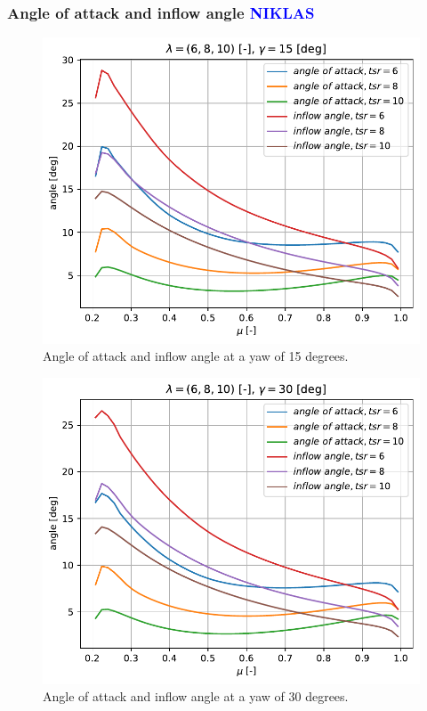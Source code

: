 \subsubsection{\textbf{Angle of attack and inflow angle} \textcolor{blue}{NIKLAS}}
\begin{figure}[htbp]
	\centering
	\includegraphics[height=0.45\textheight]{./img/yaw/alpha_phi-yaw_15.pdf}
	\caption{Angle of attack and inflow angle at a yaw of 15 degrees.}
	\label{img:yaw-aoa-15}
\end{figure}
\begin{figure}[htbp]
	\centering
	\includegraphics[height=0.45\textheight]{./img/yaw/alpha_phi-yaw_30.pdf}
	\caption{Angle of attack and inflow angle at a yaw of 30 degrees.}
	\label{img:yaw-aoa-30}
\end{figure}
